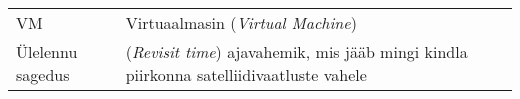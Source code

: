 \begin{longtable}{p{3cm}p{10cm}}  %
VM & Virtuaalmasin (\textit{Virtual Machine})\\
Ülelennu sagedus & (\textit{Revisit time}) ajavahemik, mis jääb mingi kindla
piirkonna satelliidivaatluste vahele\\
\end{longtable}
\addtocounter{table}{-1} %